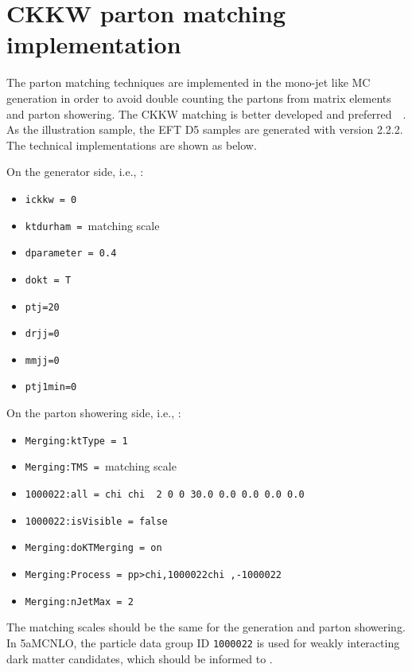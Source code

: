 \section{CKKW parton matching implementation}
\label{sec:monojet_parton_match}

The parton matching techniques are implemented in the mono-jet like MC generation in order to avoid double counting the partons from matrix elements and parton showering. The CKKW matching is better developed and preferred~\cite{Alwall:1405.0301}~\cite{Alwall:0706.2569}. As the illustration sample, the EFT D5 samples are generated with \madgraphFiveaMCNLO version 2.2.2. The technical implementations are shown as below.

On the generator side, i.e., \madgraphFiveaMCNLO:
\begin{itemize}
\item \texttt{ickkw = 0}
\item \texttt{ktdurham = }matching scale
\item \texttt{dparameter = 0.4}
\item \texttt{dokt = T}
\item \texttt{ptj=20}
\item \texttt{drjj=0}
\item \texttt{mmjj=0}
\item \texttt{ptj1min=0}
\end{itemize}
On the parton showering side, i.e., \pythiaEight:
\begin{itemize}
\item \texttt{Merging:ktType           = 1}
\item \texttt{Merging:TMS              = }matching scale
\item \texttt{1000022:all = chi chi~ 2 0 0 30.0 0.0 0.0 0.0 0.0}
\item \texttt{1000022:isVisible = false}
\item \texttt{Merging:doKTMerging      = on}
\item \texttt{Merging:Process          = pp>{chi,1000022}{chi~,-1000022}}
\item \texttt{Merging:nJetMax          = 2}
\end{itemize}
The matching scales should be the same for the generation and parton showering. In \madgraph5aMCNLO, the particle data group ID \texttt{1000022} is used for weakly interacting dark matter candidates, which should be informed to \pythiaEight.

